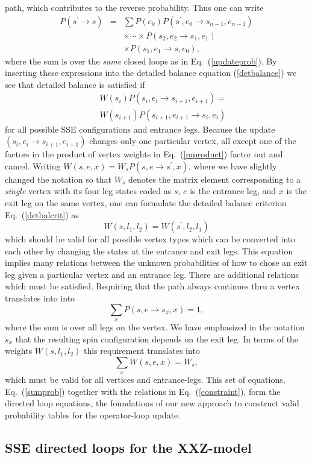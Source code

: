 \documentclass[10pt,pre,aps,twocolumn,showpacs,superscriptaddress,
floatfix]{revtex4}
\newcommand{\be}{\begin{equation}}
\newcommand{\ee}{\end{equation}}
\newcommand{\bea}{\begin{eqnarray}}
\newcommand{\eea}{\end{eqnarray}}
\begin{document}
path, which contributes to the reverse probability. Thus one can write
\bea
	P(s^\prime \to s) & = & \sum P(e_0)P(s^\prime,e_0 \to s_{n-1},e_{n-1}) 
	\nonumber \\ 
                &   & \times \cdots \times P(s_2,e_2  \to s_1,e_1) \\
	         &  & \times P(s_1,e_1 \to s,e_0), \nonumber 
\eea
where the sum is over the {\em same} closed loops as in Eq.~(\ref{updateprob}).
By inserting these expressions into the detailed balance equation
(\ref{detbalance}) we see that detailed balance is satisfied if
\bea
	& & W(s_i) P(s_i,e_i \to s_{i+1},e_{i+1}) = \nonumber \\
	& & W(s_{i+1})P(s_{i+1},e_{i+1} \to s_i,e_{i}) \label{detbalcrit}
\eea
for all possible SSE configurations and entrance legs. Because the update
$(s_i,e_i \to s_{i+1},e_{i+1})$ changes only one particular vertex, all except
one of the factors in the product of vertex weights in Eq.~(\ref{mproduct}) 
factor out and cancel. Writing $W(s,e,x) = W_s P(s,e \to s^\prime,x)$, 
where we have slightly changed the notation so that $W_s$ denotes the matrix 
element corresponding to a {\em single} vertex with its four leg states 
coded as $s$, $e$ is the entrance leg, and $x$ is the exit leg on the same 
vertex, one can formulate the detailed 
balance criterion Eq.~(\ref{detbalcrit}) as
\be
	W(s,l_1,l_2) = W(s^\prime,l_2,l_1) \label{constraint}
\ee	  
which should be valid for all possible vertex types which can be converted 
into 
each other by changing the states at the entrance and exit legs. This equation
implies many relations between the unknown probabilities of how to chose an 
exit leg given a particular vertex and an entrance leg. There are additional 
relations which must be satisfied. Requiring that the path always continues 
thru a vertex translates into into 
\be
	\sum_{x} P(s,e \to s_x,x) = 1,
\ee
where the sum is over all legs on the vertex. We have emphasized in the
notation $s_x$ that the resulting spin configuration depends on the 
exit leg. In terms of the weights $W(s,l_1,l_2)$ this requirement translates 
into
\be \label{sumprob}
	\sum_{x} W(s,e,x) = W_s,
\ee
which must be valid for all vertices and entrance-legs. This set of equations, 
Eq.~(\ref{sumprob}) together with the relations in Eq.~(\ref{constraint}), 
form the directed loop equations, the foundations of our new approach to
construct valid probability tables for the operator-loop update.

\subsection{SSE directed loops for the XXZ-model}
\end{document}
